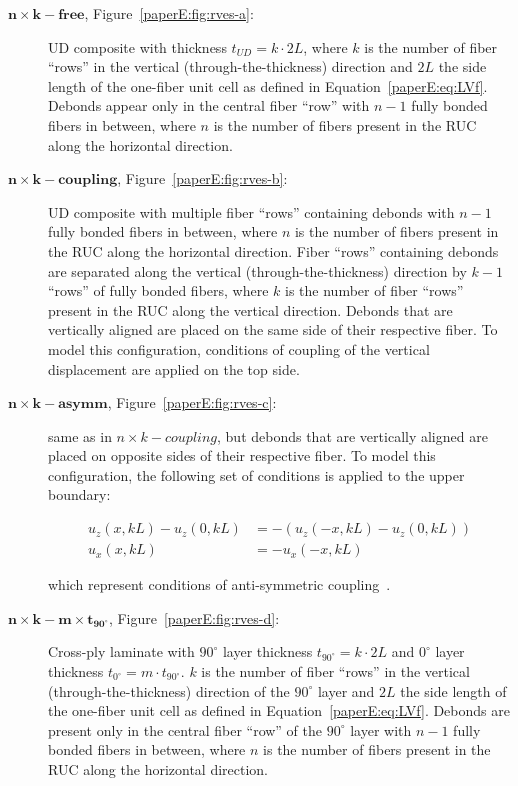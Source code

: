 \begin{description}
\item [$\mathbf{n\times k-free}$, Figure~\ref{paperE:fig:rves-a}: ]UD composite with thickness $t_{UD}=k\cdot2L$, where $k$ is the number of fiber ``rows'' in the vertical (through-the-thickness) direction and $2L$ the side length of the one-fiber unit cell as defined in Equation~\ref{paperE:eq:LVf}. Debonds appear only in the central fiber ``row'' with $n-1$ fully bonded fibers in between, where $n$ is the number of fibers present in the RUC along the horizontal direction.
\item [$\mathbf{n\times k-coupling}$, Figure~\ref{paperE:fig:rves-b}: ]UD composite with multiple fiber ``rows'' containing debonds with $n-1$ fully bonded fibers in between, where $n$ is the number of fibers present in the RUC along the horizontal direction. Fiber ``rows'' containing debonds are separated along the vertical (through-the-thickness) direction by $k-1$ ``rows'' of fully bonded fibers, where $k$ is the number of fiber ``rows'' present in the RUC along the vertical direction. Debonds that are vertically aligned are placed on the same side of their respective fiber. To model this configuration, conditions of coupling of the vertical displacement are applied on the top side.
\item [$\mathbf{n\times k-asymm}$, Figure~\ref{paperE:fig:rves-c}: ]same as in $n\times k-coupling$, but debonds that are vertically aligned are placed on opposite sides of their respective fiber. To model this configuration, the following set of conditions is applied to the upper boundary:

\begin{equation}\label{paperE:eq:asymm}
\begin{aligned}
u_{z}\left(x,kL\right)-u_{z}\left(0,kL\right)&=-\left(u_{z}\left(-x,kL\right)-u_{z}\left(0,kL\right)\right)\\
u_{x}\left(x,kL\right)&=-u_{x}\left(-x,kL\right)
\end{aligned}
\end{equation}

which represent conditions of anti-symmetric coupling~\cite{DiStasio2019b}.

\item [$\mathbf{n\times k-m\times t_{90^{\circ}}}$, Figure~\ref{paperE:fig:rves-d}: ]Cross-ply laminate with $90^{\circ}$ layer thickness $t_{90^{\circ}}=k\cdot2L$ and $0^{\circ}$ layer thickness $t_{0^{\circ}}=m\cdot t_{90^{\circ}}$. $k$ is the number of fiber ``rows'' in the vertical (through-the-thickness) direction of the $90^{\circ}$ layer and $2L$ the side length of the one-fiber unit cell as defined in Equation~\ref{paperE:eq:LVf}. Debonds are present only in the central fiber ``row'' of the $90^{\circ}$ layer with $n-1$ fully bonded fibers in between, where $n$ is the number of fibers present in the RUC along the horizontal direction.
\end{description}


